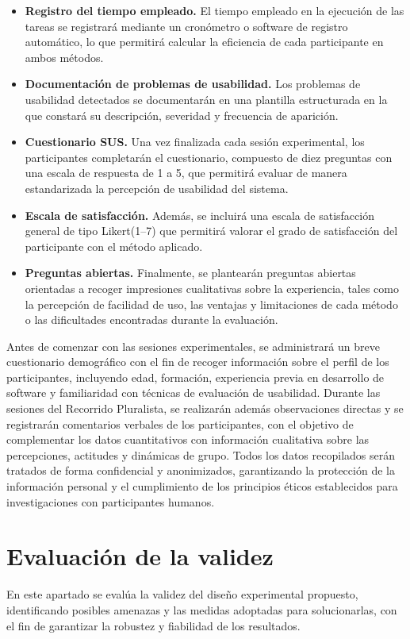 \documentclass[a4paper,12pt]{report}
\begin{document}
\begin{itemize}
    \item \textbf{Registro del tiempo empleado.} El tiempo empleado en la ejecución de las tareas se registrará mediante un cronómetro o software de registro automático, lo que permitirá calcular la eficiencia de cada participante en ambos métodos. 
    \item \textbf{Documentación de problemas de usabilidad.} Los problemas de usabilidad detectados se documentarán en una plantilla estructurada en la que constará su descripción, severidad y frecuencia de aparición.
    \item \textbf{Cuestionario SUS.} Una vez finalizada cada sesión experimental, los participantes completarán el cuestionario, compuesto de diez preguntas con una escala de respuesta de 1 a 5, que permitirá evaluar de manera estandarizada la percepción de usabilidad del sistema.
    \item \textbf{Escala de satisfacción.} Además, se incluirá una escala de satisfacción general de tipo Likert(1--7) que permitirá valorar el grado de satisfacción del participante con el método aplicado.
    \item \textbf{Preguntas abiertas.} Finalmente, se plantearán preguntas abiertas orientadas a recoger impresiones cualitativas sobre la experiencia, tales como la percepción de facilidad de uso, las ventajas y limitaciones de cada método o las dificultades encontradas durante la evaluación.  
\end{itemize}

Antes de comenzar con las sesiones experimentales, se administrará un breve cuestionario demográfico con el fin de recoger información sobre el perfil de los participantes, incluyendo 
edad, formación, experiencia previa en desarrollo de software y familiaridad con técnicas de evaluación de usabilidad. Durante las 
sesiones del Recorrido Pluralista, se realizarán además observaciones directas y se registrarán comentarios verbales de los participantes, con el objetivo 
de complementar los datos cuantitativos con información cualitativa sobre las percepciones, actitudes y dinámicas de grupo. Todos los datos recopilados 
serán tratados de forma confidencial y anonimizados, garantizando la protección de la información personal y el cumplimiento de los principios éticos establecidos
para investigaciones con participantes humanos.


\section{Evaluación de la validez}
En este apartado se evalúa la validez del diseño experimental propuesto, identificando posibles amenazas y las 
medidas adoptadas para solucionarlas, con el fin de garantizar la robustez y fiabilidad de los resultados.
\end{document}

